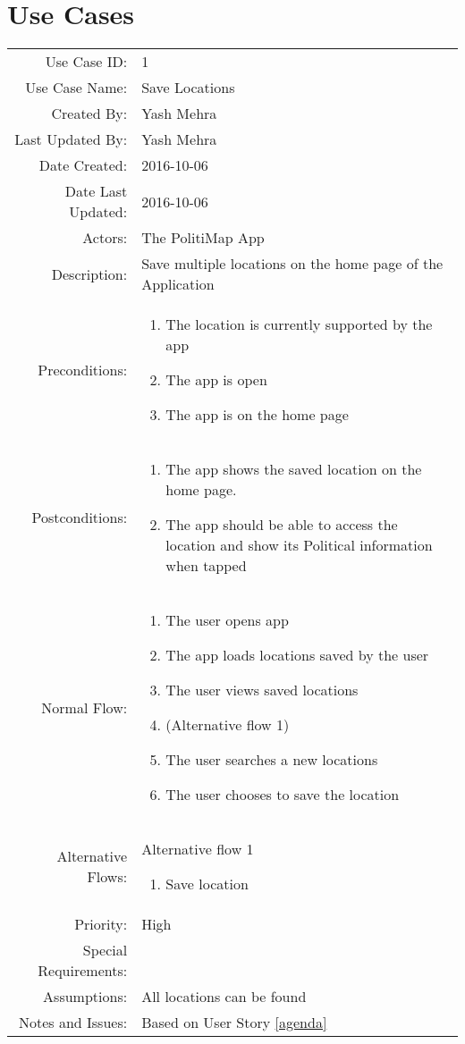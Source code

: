 \documentclass{article}
\begin{document}
\section{Use Cases}
\begin{tabu}{rX}
  \toprule
  Use Case ID: & 1\\
  Use Case Name: & Save Locations\\
  Created By: & Yash Mehra\\
  Last Updated By: & Yash Mehra\\
  Date Created: & 2016-10-06\\
  Date Last Updated: & 2016-10-06\\
  Actors: & The PolitiMap App\\
  Description: & Save multiple locations on the home page of the Application\\
  Preconditions: &
  \begin{enumerate}
  \item The location is currently supported by the app
  \item The app is open
  \item The app is on the home page
  \end{enumerate} \\
  Postconditions: &
  \begin{enumerate}
  \item The app shows the saved location on the home page.
  \item The app should be able to access the location and show its Political information when tapped
  \end{enumerate} \\
  Normal Flow: &
  \begin{enumerate}
  \item The user opens app
  \item The app loads locations saved by the user
  \item The user views saved locations
  \item (Alternative flow 1)
  \item The user searches a new locations
  \item The user chooses to save the location
  \end{enumerate} \\
  Alternative Flows: &
  Alternative flow 1
  \begin{enumerate}
  \item Save location
  \end{enumerate} \\
  Priority: & High\\
  Special Requirements: & \\
  Assumptions: & All locations can be found\\
  Notes and Issues: & Based on User Story \vref{agenda}\\
  \bottomrule
\end{tabu}
\end{document}

